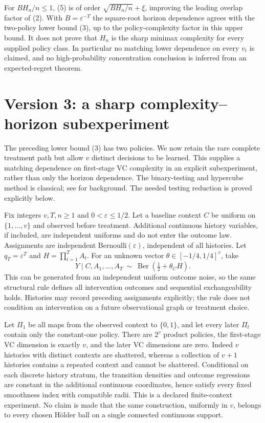 \documentclass[11pt]{article}
\theoremstyle{definition}
\begin{document}
For $B H_n/n\le1$, (5) is of order
$\sqrt{B H_n/n}+\xi$, improving the leading overlap factor of (2).
With $B=\varepsilon^{-T}$ the square-root horizon dependence agrees
with the two-policy lower bound (3), up to the policy-complexity factor
in this upper bound. It does not prove that $H_n$ is the sharp minimax
complexity for every supplied policy class. In particular no matching
lower dependence on every $v_t$ is claimed, and no high-probability
concentration conclusion is inferred from an expected-regret theorem.

\section*{Version 3: a sharp complexity--horizon subexperiment}
The preceding lower bound (3) has two policies. We now retain the rare
complete treatment path but allow $v$ distinct decisions to be learned.
This supplies a matching dependence on first-stage VC complexity in an
explicit subexperiment, rather than only the horizon dependence.
The binary-testing and hypercube method is classical; see \cite{tsybakov}
for background. The needed testing reduction is proved explicitly below.

Fix integers $v,T,n\ge1$ and $0<\varepsilon\le1/2$.
Let a baseline context $C$ be uniform on $\{1,\ldots,v\}$ and observed
before treatment. Additional continuous history variables, if included,
are independent uniforms and do not enter the outcome law. Assignments
are independent Bernoulli$(\varepsilon)$, independent of all histories.
Let $q_T=\varepsilon^T$ and $H=\prod_{t=1}^T A_t$.
For an unknown vector $\theta\in[-1/4,1/4]^v$, take
\[
 Y\mid C,A_1,\ldots,A_T\ \sim\
 \operatorname{Ber}\left(\tfrac12+\theta_C H\right).    \tag{6}
\]
This can be generated from an independent uniform outcome noise, so the
same structural rule defines all intervention outcomes and sequential
exchangeability holds. Histories may record preceding assignments
explicitly; the rule does not condition an intervention on a future
observational graph or treatment choice.

Let $\Pi_1$ be all maps from the observed context to $\{0,1\}$,
and let every later $\Pi_t$ contain only the constant-one policy.
There are $2^v$ product policies, the first-stage VC dimension is
exactly $v$, and the later VC dimensions are zero. Indeed $v$
histories with distinct contexts are shattered, whereas a collection of
$v+1$ histories contains a repeated context and cannot be shattered.
Conditional on each discrete history stratum, the transition densities
and outcome regressions are constant in the additional continuous
coordinates, hence satisfy every fixed smoothness index with compatible
radii. This is a declared finite-context experiment. No claim is made
that the same construction, uniformly in $v$, belongs to every chosen
H\"older ball on a single connected continuous support.
\end{document}
